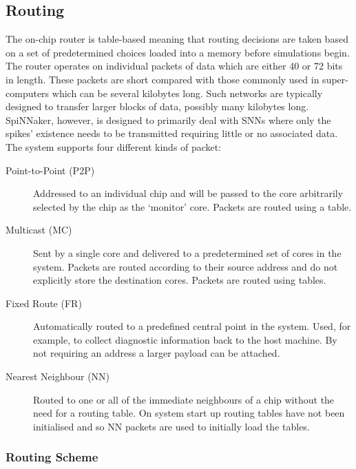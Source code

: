 		\subsection{Routing}
			
			The on-chip router is table-based meaning that routing decisions are taken
			based on a set of predetermined choices loaded into a memory before
			simulations begin. The router operates on individual packets of data which
			are either 40 or 72 bits in length. These packets are short compared with
			those commonly used in super-computers which can be several kilobytes
			long.  Such networks are typically designed to transfer larger blocks of
			data, possibly many kilobytes long. SpiNNaker, however, is designed to
			primarily deal with SNNs where only the spikes' existence needs to be
			transmitted requiring little or no associated data.  The system supports
			four different kinds of packet:
			
			\begin{description}
				
				\item[Point-to-Point (P2P)] Addressed to an individual chip and will be
				passed to the core arbitrarily selected by the chip as the `monitor'
				core. Packets are routed using a table.
				
				\item[Multicast (MC)] Sent by a single core and delivered to a
				predetermined set of cores in the system. Packets are routed according
				to their source address and do not explicitly store the destination
				cores. Packets are routed using tables.
				
				\item[Fixed Route (FR)] Automatically routed to a predefined central
				point in the system. Used, for example, to collect diagnostic
				information back to the host machine. By not requiring an address a
				larger payload can be attached.
				
				\item[Nearest Neighbour (NN)] Routed to one or all of the immediate
				neighbours of a chip without the need for a routing table. On system
				start up routing tables have not been initialised and so NN packets are
				used to initially load the tables.
				
			\end{description}
			
			\subsubsection{Routing Scheme}
				

